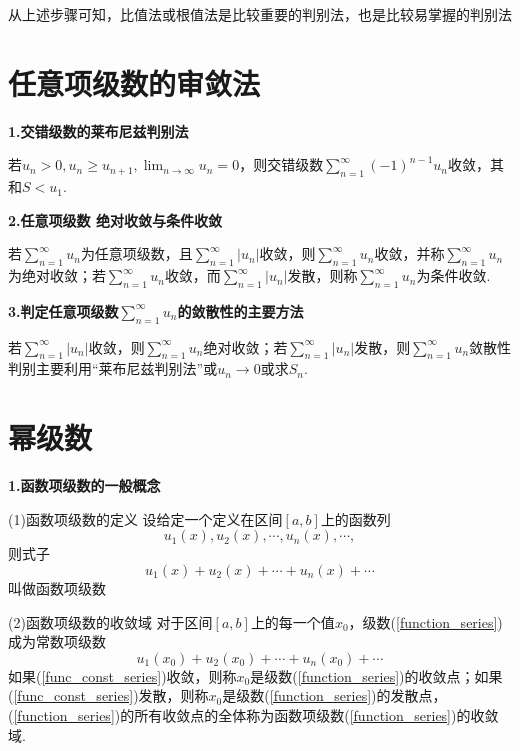 从上述步骤可知，比值法或根值法是比较重要的判别法，也是比较易掌握的判别法

\section{任意项级数的审敛法}

\textbf{1.交错级数的莱布尼兹判别法}

若$u_n>0,u_n\geq u_{n+1},\displaystyle\lim_{n\rightarrow\infty}u_n=0$，则交错级数$\displaystyle\sum_{n=1}^\infty(-1)^{n-1}u_n$收敛，其和$S<u_1$.

\textbf{2.任意项级数 \quad 绝对收敛与条件收敛}

若$\displaystyle\sum_{n=1}^\infty u_n$为任意项级数，且$\displaystyle\sum_{n=1}^\infty|u_n|$收敛，则$\displaystyle\sum_{n=1}^\infty u_n$收敛，并称$\displaystyle\sum_{n=1}^\infty u_n$为绝对收敛；若$\displaystyle\sum_{n=1}^\infty u_n$收敛，而$\displaystyle\sum_{n=1}^\infty|u_n|$发散，则称$\displaystyle\sum_{n=1}^\infty u_n$为条件收敛.

\textbf{3.判定任意项级数$\displaystyle\sum_{n=1}^\infty u_n$的敛散性的主要方法}

若$\displaystyle\sum_{n=1}^\infty |u_n|$收敛，则$\displaystyle\sum_{n=1}^\infty u_n$绝对收敛；若$\displaystyle\sum_{n=1}^\infty |u_n|$发散，则$\displaystyle\sum_{n=1}^\infty u_n$敛散性判别主要利用“莱布尼兹判别法”或$u_n\rightarrow0$或求$S_n$.

\section{幂级数}
\textbf{1.函数项级数的一般概念}

(1)函数项级数的定义 \quad 设给定一个定义在区间$[a,b]$上的函数列
\begin{equation*}
    u_1(x),u_2(x),\cdots,u_n(x),\cdots,
\end{equation*}
则式子
\begin{equation}
    u_1(x)+u_2(x)+\cdots+u_n(x)+\cdots \label{function_series}
\end{equation}
叫做函数项级数

(2)函数项级数的收敛域 \quad 对于区间$[a,b]$上的每一个值$x_0$，级数(\ref{function_series})成为常数项级数
\begin{equation}
    u_1(x_0)+u_2(x_0)+\cdots+u_n(x_0)+\cdots \label{func_const_series}
\end{equation}
如果(\ref{func_const_series})收敛，则称$x_0$是级数(\ref{function_series})的收敛点；如果(\ref{func_const_series})发散，则称$x_0$是级数(\ref{function_series})的发散点，(\ref{function_series})的所有收敛点的全体称为函数项级数(\ref{function_series})的收敛域.

